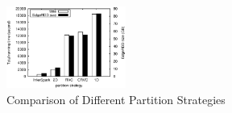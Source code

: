 
\begin{figure}[h]\centering
	\includegraphics[width=0.35\textwidth]{figs/exp_partition_strategy.eps}
	\caption{Comparison of Different Partition Strategies}
	\label{fig:exp_partition_strategy}
\end{figure}


